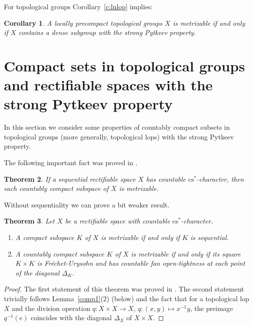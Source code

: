\documentclass{amsart}
\newtheorem{theorem}{Theorem}[section]
\newtheorem{corollary}[theorem]{Corollary}
\theoremstyle{definition}
\begin{document}
For topological groups Corollary~\ref{c:lnlop} implies:

\begin{corollary}\label{c:lngrp} A locally precompact topological groups $X$ is metrizable if and only if $X$ contains a dense subgroup with the strong Pytkeev property.
\end{corollary}

\section{Compact sets in topological groups and rectifiable spaces with the strong Pytkeev property}\label{s6}

In this section we consider some properties of countably compact subsets in topological groups (more generally, topological lops) with the strong Pytkeev property.

The following important fact was proved in \cite{BR}.

\begin{theorem} If a sequential rectifiable space $X$ has countable ${\mathrm{cs}}^*$-character, then each  countably compact subspace of $X$ is metrizable.
\end{theorem}

Without sequentiality we can prove a bit weaker result.

\begin{theorem}\label{t:rectcs} Let $X$ be a rectifiable space with countable ${\mathrm{cs}}^*$-character.
\begin{enumerate}
\item A compact subspace $K$ of $X$ is metrizable if and only if $K$ is sequential.
\item A countably compact subspace $K$ of $X$ is metrizable if and only if its square $K\times K$ is Fr\'echet-Urysohn and has countable fan open-tightness at each point of the diagonal $\Delta_K$.
\end{enumerate}
\end{theorem}

\begin{proof} The first statement of this theorem was proved in \cite{BR}. The second statement trivially follows Lemma~\ref{comp1}(2) (below) and the fact that for a topological lop $X$ and the division operation $q:X\times X\to X$, $q:(x,y)\mapsto x^{-1}y$, the preimage $q^{-1}(e)$ coincides with the diagonal $\Delta_X$ of $X\times X$.
\end{proof}
\end{document}
